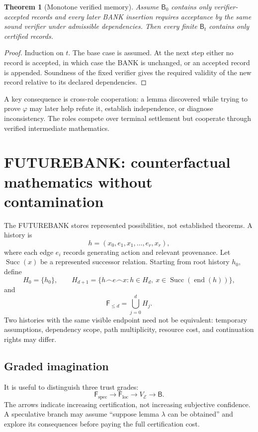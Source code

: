 \documentclass[11pt]{article}
\newtheorem{theorem}{Theorem}[section]
\newcommand{\Bank}{\mathsf{B}}
\newcommand{\Future}{\mathsf{F}}
\newcommand{\Env}{\mathcal{E}}
\begin{document}
\begin{theorem}[Monotone verified memory]
Assume $\Bank_0$ contains only verifier-accepted records and every later BANK insertion requires acceptance by the same sound verifier under admissible dependencies. Then every finite $\Bank_t$ contains only certified records.
\end{theorem}
\begin{proof}
Induction on $t$. The base case is assumed. At the next step either no record is accepted, in which case the BANK is unchanged, or an accepted record is appended. Soundness of the fixed verifier gives the required validity of the new record relative to its declared dependencies.
\end{proof}

A key consequence is cross-role cooperation: a lemma discovered while trying to prove $\varphi$ may later help refute it, establish independence, or diagnose inconsistency. The roles compete over terminal settlement but cooperate through verified intermediate mathematics.

\section{FUTUREBANK: counterfactual mathematics without contamination}

The FUTUREBANK stores represented possibilities, not established theorems. A history is
\[
h=(x_0,e_1,x_1,\ldots,e_r,x_r),
\]
where each edge $e_i$ records generating action and relevant provenance. Let $\operatorname{Succ}(x)$ be a represented successor relation. Starting from root history $h_0$, define
\[
H_0=\{h_0\},\qquad
H_{d+1}=\{h\frown e\frown x:h\in H_d,\ x\in\operatorname{Succ}(\operatorname{end}(h))\},
\]
and
\[
\Future_{\le d}=\bigcup_{j=0}^d H_j.
\]
Two histories with the same visible endpoint need not be equivalent: temporary assumptions, dependency scope, path multiplicity, resource cost, and continuation rights may differ.

\subsection{Graded imagination}

It is useful to distinguish three trust grades:
\[
\Future_{\mathrm{spec}}
\longrightarrow
\Future_{\mathrm{loc}}
\longrightarrow
V_{\Env}
\longrightarrow
\Bank.
\]
The arrows indicate increasing certification, not increasing subjective confidence. A speculative branch may assume ``suppose lemma $\lambda$ can be obtained'' and explore its consequences before paying the full certification cost.
\end{document}
